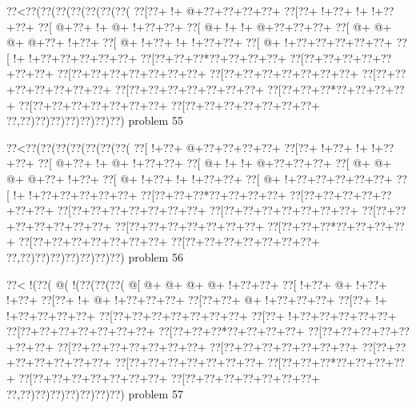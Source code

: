 \vbox{\vbox{\goo
\0??<\0??(\0??(\0??(\0??(\0??(\0??(\0??(
\0??[\0??+\- !+\- @+\0??+\0??+\0??+\0??+
\0??[\0??+\- !+\0??+\- !+\- !+\0??+\0??+
\0??[\- @+\0??+\- !+\- @+\- !+\0??+\0??+
\0??[\- @+\- !+\- !+\- @+\0??+\0??+\0??+
\0??[\- @+\- @+\- @+\- @+\0??+\- !+\0??+
\0??[\- @+\- !+\0??+\- !+\- !+\0??+\0??+
\0??[\- @+\- !+\0??+\0??+\0??+\0??+\0??+
\0??[\- !+\- !+\0??+\0??+\0??+\0??+\0??+
\0??[\0??+\0??+\0??*\0??+\0??+\0??+\0??+
\0??[\0??+\0??+\0??+\0??+\0??+\0??+\0??+
\0??[\0??+\0??+\0??+\0??+\0??+\0??+\0??+
\0??[\0??+\0??+\0??+\0??+\0??+\0??+\0??+
\0??[\0??+\0??+\0??+\0??+\0??+\0??+\0??+
\0??[\0??+\0??+\0??+\0??+\0??+\0??+\0??+
\0??[\0??+\0??+\0??*\0??+\0??+\0??+\0??+
\0??[\0??+\0??+\0??+\0??+\0??+\0??+\0??+
\0??[\0??+\0??+\0??+\0??+\0??+\0??+\0??+
\0??,\0??)\0??)\0??)\0??)\0??)\0??)\0??)
}
\hfil problem 55\hfil\break
}

\vbox{\vbox{\goo
\0??<\0??(\0??(\0??(\0??(\0??(\0??(\0??(
\0??[\- !+\0??+\- @+\0??+\0??+\0??+\0??+
\0??[\0??+\- !+\0??+\- !+\- !+\0??+\0??+
\0??[\- @+\0??+\- !+\- @+\- !+\0??+\0??+
\0??[\- @+\- !+\- !+\- @+\0??+\0??+\0??+
\0??[\- @+\- @+\- @+\- @+\0??+\- !+\0??+
\0??[\- @+\- !+\0??+\- !+\- !+\0??+\0??+
\0??[\- @+\- !+\0??+\0??+\0??+\0??+\0??+
\0??[\- !+\- !+\0??+\0??+\0??+\0??+\0??+
\0??[\0??+\0??+\0??*\0??+\0??+\0??+\0??+
\0??[\0??+\0??+\0??+\0??+\0??+\0??+\0??+
\0??[\0??+\0??+\0??+\0??+\0??+\0??+\0??+
\0??[\0??+\0??+\0??+\0??+\0??+\0??+\0??+
\0??[\0??+\0??+\0??+\0??+\0??+\0??+\0??+
\0??[\0??+\0??+\0??+\0??+\0??+\0??+\0??+
\0??[\0??+\0??+\0??*\0??+\0??+\0??+\0??+
\0??[\0??+\0??+\0??+\0??+\0??+\0??+\0??+
\0??[\0??+\0??+\0??+\0??+\0??+\0??+\0??+
\0??,\0??)\0??)\0??)\0??)\0??)\0??)\0??)
}
\hfil problem 56\hfil\break
}

\vbox{\vbox{\goo
\0??<\- !(\0??(\- @(\- !(\0??(\0??(\0??(
\- @[\- @+\- @+\- @+\- @+\- !+\0??+\0??+
\0??[\- !+\0??+\- @+\- !+\0??+\- !+\0??+
\0??[\0??+\- !+\- @+\- !+\0??+\0??+\0??+
\0??[\0??+\0??+\- @+\- !+\0??+\0??+\0??+
\0??[\0??+\- !+\- !+\0??+\0??+\0??+\0??+
\0??[\0??+\0??+\0??+\0??+\0??+\0??+\0??+
\0??[\0??+\- !+\0??+\0??+\0??+\0??+\0??+
\0??[\0??+\0??+\0??+\0??+\0??+\0??+\0??+
\0??[\0??+\0??+\0??*\0??+\0??+\0??+\0??+
\0??[\0??+\0??+\0??+\0??+\0??+\0??+\0??+
\0??[\0??+\0??+\0??+\0??+\0??+\0??+\0??+
\0??[\0??+\0??+\0??+\0??+\0??+\0??+\0??+
\0??[\0??+\0??+\0??+\0??+\0??+\0??+\0??+
\0??[\0??+\0??+\0??+\0??+\0??+\0??+\0??+
\0??[\0??+\0??+\0??*\0??+\0??+\0??+\0??+
\0??[\0??+\0??+\0??+\0??+\0??+\0??+\0??+
\0??[\0??+\0??+\0??+\0??+\0??+\0??+\0??+
\0??,\0??)\0??)\0??)\0??)\0??)\0??)\0??)
}
\hfil problem 57\hfil\break
}

